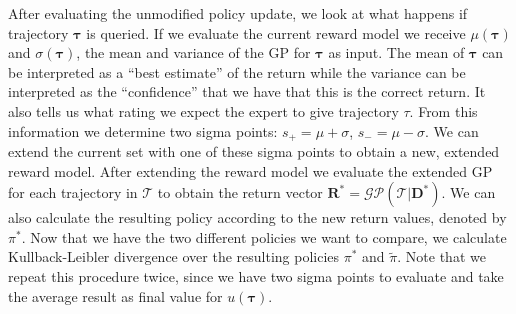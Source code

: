 \documentclass[mscThesis.tex]{subfiles}
\begin{document}
After evaluating the unmodified policy update, we look at what happens if trajectory $\bm{\tau}$ is queried. If we evaluate the current reward model we receive $\mu(\bm{\tau})$ and $\sigma (\bm{\tau})$, the mean and variance of the GP for $\bm{\tau}$ as input. The mean of $\bm{\tau}$ can be interpreted as a ``best estimate'' of the return while the variance can be interpreted as the ``confidence'' that we have that this is the correct return. It also tells us what rating we expect the expert to give trajectory $\tau$. From this information we determine two sigma points: $s_+ = \mu + \sigma$, $s_- = \mu - \sigma$. We can extend the current set with one of these sigma points to obtain a new, extended reward model. After extending the reward model we evaluate the extended GP for each trajectory in $\mathcal{T}$ to obtain the return vector $\bm{R}^* = \mathcal{GP}(\mathcal{T}|\bm{D}^*)$. We can also calculate the resulting policy according to the new return values, denoted by $\pi^*$. Now that we have the two different policies we want to compare, we calculate Kullback-Leibler divergence over the resulting policies $\pi^*$ and $\tilde{\pi}$. Note that we repeat this procedure twice, since we have two sigma points to evaluate and take the average result as final value for $u(\bm{\tau})$.
\end{document}
